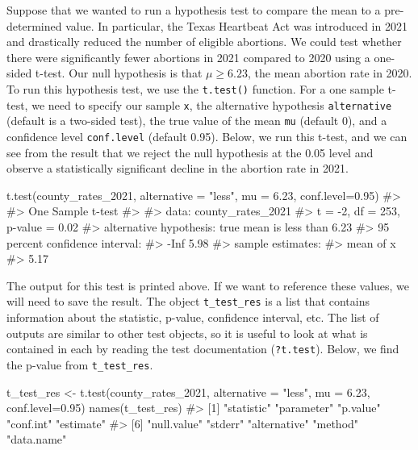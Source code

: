 \documentclass[
  letterpaper,
]{krantz}
\makeatletter
\newenvironment{Shaded}{\begin{snugshade}}{\end{snugshade}}
\newcommand{\AttributeTok}[1]{\textcolor[rgb]{0.40,0.45,0.13}{#1}}
\newcommand{\CommentTok}[1]{\textcolor[rgb]{0.37,0.37,0.37}{#1}}
\newcommand{\FloatTok}[1]{\textcolor[rgb]{0.68,0.00,0.00}{#1}}
\newcommand{\FunctionTok}[1]{\textcolor[rgb]{0.28,0.35,0.67}{#1}}
\newcommand{\NormalTok}[1]{\textcolor[rgb]{0.00,0.23,0.31}{#1}}
\newcommand{\OtherTok}[1]{\textcolor[rgb]{0.00,0.23,0.31}{#1}}
\newcommand{\StringTok}[1]{\textcolor[rgb]{0.13,0.47,0.30}{#1}}
\newenvironment{kframe}{%
\medskip{}
\setlength{\fboxsep}{.8em}
 \def\at@end@of@kframe{}%
 \ifinner\ifhmode%
  \def\at@end@of@kframe{\end{minipage}}%
  \begin{minipage}{\columnwidth}%
 \fi\fi%
 \def\FrameCommand##1{\hskip\@totalleftmargin \hskip-\fboxsep
 \colorbox{shadecolor}{##1}\hskip-\fboxsep
     \hskip-\linewidth \hskip-\@totalleftmargin \hskip\columnwidth}%
 \MakeFramed {\advance\hsize-\width
   \@totalleftmargin\z@ \linewidth\hsize
   \@setminipage}}%
 {\par\unskip\endMakeFramed%
 \at@end@of@kframe}
\renewenvironment{Shaded}{\begin{kframe}}{\end{kframe}}
\makeatother
\begin{document}
Suppose that we wanted to run a hypothesis test to compare the mean to a
pre-determined value. In particular, the Texas Heartbeat Act was
introduced in 2021 and drastically reduced the number of eligible
abortions. We could test whether there were significantly fewer
abortions in 2021 compared to 2020 using a one-sided t-test. Our null
hypothesis is that \(\mu \geq 6.23\), the mean abortion rate in 2020. To
run this hypothesis test, we use the \texttt{t.test()} function. For a
one sample t-test, we need to specify our sample \texttt{x}, the
alternative hypothesis \texttt{alternative} (default is a two-sided
test), the true value of the mean \texttt{mu} (default 0), and a
confidence level \texttt{conf.level} (default 0.95). Below, we run this
t-test, and we can see from the result that we reject the null
hypothesis at the 0.05 level and observe a statistically significant
decline in the abortion rate in 2021.

\begin{Shaded}
\begin{Highlighting}[]
\FunctionTok{t.test}\NormalTok{(county\_rates\_2021, }\AttributeTok{alternative =} \StringTok{"less"}\NormalTok{, }\AttributeTok{mu =} \FloatTok{6.23}\NormalTok{, }
       \AttributeTok{conf.level=}\FloatTok{0.95}\NormalTok{)}
\CommentTok{\#\textgreater{} }
\CommentTok{\#\textgreater{}  One Sample t{-}test}
\CommentTok{\#\textgreater{} }
\CommentTok{\#\textgreater{} data:  county\_rates\_2021}
\CommentTok{\#\textgreater{} t = {-}2, df = 253, p{-}value = 0.02}
\CommentTok{\#\textgreater{} alternative hypothesis: true mean is less than 6.23}
\CommentTok{\#\textgreater{} 95 percent confidence interval:}
\CommentTok{\#\textgreater{}  {-}Inf 5.98}
\CommentTok{\#\textgreater{} sample estimates:}
\CommentTok{\#\textgreater{} mean of x }
\CommentTok{\#\textgreater{}      5.17}
\end{Highlighting}
\end{Shaded}

The output for this test is printed above. If we want to reference these
values, we will need to save the result. The object
\texttt{t\_test\_res} is a list that contains information about the
statistic, p-value, confidence interval, etc. The list of outputs are
similar to other test objects, so it is useful to look at what is
contained in each by reading the test documentation (\texttt{?t.test}).
Below, we find the p-value from \texttt{t\_test\_res}.

\begin{Shaded}
\begin{Highlighting}[]
\NormalTok{t\_test\_res }\OtherTok{\textless{}{-}} \FunctionTok{t.test}\NormalTok{(county\_rates\_2021, }\AttributeTok{alternative =} \StringTok{"less"}\NormalTok{, }\AttributeTok{mu =} \FloatTok{6.23}\NormalTok{, }
       \AttributeTok{conf.level=}\FloatTok{0.95}\NormalTok{)}
\FunctionTok{names}\NormalTok{(t\_test\_res)}
\CommentTok{\#\textgreater{}  [1] "statistic"   "parameter"   "p.value"     "conf.int"    "estimate"   }
\CommentTok{\#\textgreater{}  [6] "null.value"  "stderr"      "alternative" "method"      "data.name"}
\end{Highlighting}
\end{Shaded}
\end{document}

